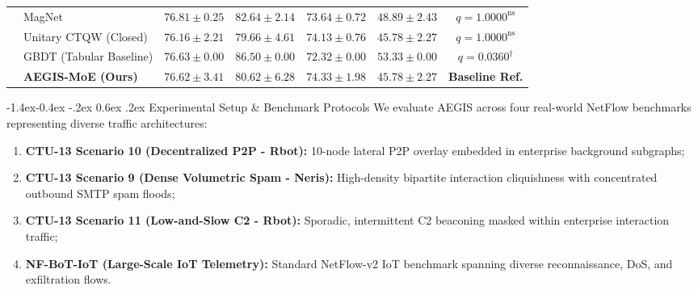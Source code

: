 \documentclass[10pt,twocolumn,letterpaper]{article}
\makeatletter
\renewcommand\subsection{\@startsection{subsection}{2}{\z@}%
                                     {-1.4ex\@plus -0.4ex \@minus -.2ex}%
                                     {0.6ex \@plus .2ex}%
                                     {\normalfont\normalsize\bfseries}}
\makeatother
\begin{document}
\begin{table}[t]
{\begin{tabular}{llccccc}
& MagNet & $\mathbf{76.81 \pm 0.25}$ & $82.64 \pm 2.14$ & $73.64 \pm 0.72$ & $48.89 \pm 2.43$ & $q = 1.0000^{\text{ns}}$ \\
& Unitary CTQW (Closed) & $76.16 \pm 2.21$ & $79.66 \pm 4.61$ & $74.13 \pm 0.76$ & $\mathbf{45.78 \pm 2.27}$ & $q = 1.0000^{\text{ns}}$ \\
& GBDT (Tabular Baseline) & $76.63 \pm 0.00$ & $\mathbf{86.50 \pm 0.00}$ & $72.32 \pm 0.00$ & $53.33 \pm 0.00$ & $q = 0.0360^{\dagger}$ \\
& \textbf{AEGIS-MoE (Ours)} & $76.62 \pm 3.41$ & $80.62 \pm 6.28$ & $\mathbf{74.33 \pm 1.98}$ & $\mathbf{45.78 \pm 2.27}$ & \textbf{Baseline Ref.} \\
\bottomrule
\end{tabular}
}
\end{table}

\subsection{Experimental Setup \& Benchmark Protocols}
We evaluate AEGIS across four real-world NetFlow benchmarks representing diverse traffic architectures:
\begin{enumerate}
    \item \textbf{CTU-13 Scenario 10 (Decentralized P2P - Rbot):} 10-node lateral P2P overlay embedded in enterprise background subgraphs;
    \item \textbf{CTU-13 Scenario 9 (Dense Volumetric Spam - Neris):} High-density bipartite interaction cliquishness with concentrated outbound SMTP spam floods;
    \item \textbf{CTU-13 Scenario 11 (Low-and-Slow C2 - Rbot):} Sporadic, intermittent C2 beaconing masked within enterprise interaction traffic;
    \item \textbf{NF-BoT-IoT (Large-Scale IoT Telemetry):} Standard NetFlow-v2 IoT benchmark spanning diverse reconnaissance, DoS, and exfiltration flows.
\end{enumerate}
\end{document}
